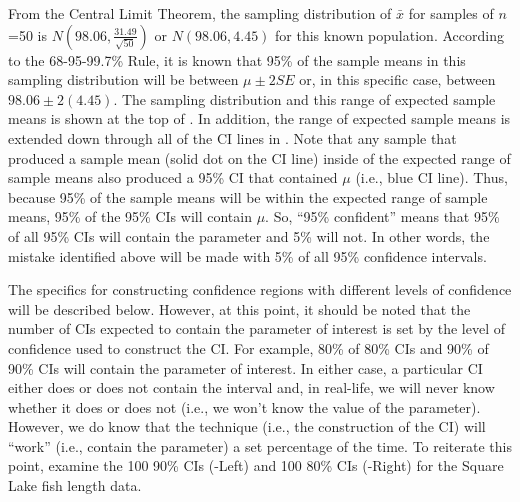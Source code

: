\documentclass[10pt,openany]{book}\usepackage[]{graphicx}\usepackage[]{color}
\begin{document}
\vspace{12pt}  %

From the Central Limit Theorem, the sampling distribution of $\bar{x}$ for samples of $n$=50 is $N(98.06,\frac{31.49}{\sqrt{50}})$ or $N(98.06,4.45)$ for this known population.  According to the 68-95-99.7\% Rule, it is known that 95\% of the sample means in this sampling distribution will be between $\mu\pm2SE$ or, in this specific case, between $98.06\pm2(4.45)$.  The sampling distribution and this range of expected sample means is shown at the top of .  In addition, the range of expected sample means is extended down through all of the CI lines in .  Note that any sample that produced a sample mean (solid dot on the CI line) inside of the expected range of sample means also produced a 95\% CI that contained $\mu$ (i.e., blue CI line).  Thus, because 95\% of the sample means will be within the expected range of sample means, 95\% of the 95\% CIs will contain $\mu$.  So, ``95\% confident'' means that 95\% of all 95\% CIs will contain the parameter and 5\% will not.  In other words, the mistake identified above will be made with 5\% of all 95\% confidence intervals.

The specifics for constructing confidence regions with different levels of confidence will be described below.  However, at this point, it should be noted that the number of CIs expected to contain the parameter of interest is set by the level of confidence used to construct the CI.  For example, 80\% of 80\% CIs and 90\% of 90\% CIs will contain the parameter of interest.  In either case, a particular CI either does or does not contain the interval and, in real-life, we will never know whether it does or does not (i.e., we won't know the value of the parameter).  However, we do know that the technique (i.e., the construction of the CI) will ``work'' (i.e., contain the parameter) a set percentage of the time.  To reiterate this point, examine the 100 90\% CIs (-Left) and 100 80\% CIs (-Right) for the Square Lake fish length data.
\end{document}
